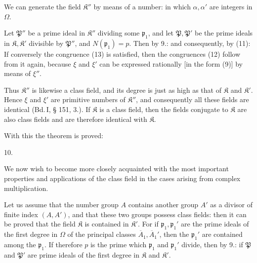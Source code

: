We can generate the field $\mathfrak{K}''$ by means of a number:
in which $\alpha, \alpha'$ are integers in $\Omega$.

Let $\mathfrak{P}''$ be a prime ideal in $\mathfrak{K}''$ dividing some $\mathfrak{p}_1$, and let
$\mathfrak{P}, \mathfrak{P}'$ be the prime ideals in $\mathfrak{K}, \mathfrak{K}'$ divisible by $\mathfrak{P}''$, and $N(\mathfrak{p}_1) = p$.
Then by 9.:
and consequently, by (11):
If conversely the congruence (13) is satisfied, then the congruences (12)
follow from it again, because $\xi$ and $\xi'$ can be expressed rationally
[in the form (9)] by means of $\xi''$.

Thus $\mathfrak{K}''$ is likewise a class field, and its degree is just as
high as that of $\mathfrak{K}$ and $\mathfrak{K}'$. Hence $\xi$ and $\xi'$ are primitive
numbers of $\mathfrak{K}''$, and consequently all these fields are identical (Bd.\,I,
§ 151, 3.). If $\mathfrak{K}$ is a class field, then the fields conjugate to $\mathfrak{K}$
are also class fields and are therefore identical with $\mathfrak{K}$.

With this the theorem is proved:

10. 

We now wish to become more closely acquainted with the most important properties and
applications of the class field in the cases arising from complex
multiplication.

Let us assume that the number group $A$ contains another group $A'$ as a divisor of
finite index $(A, A')$, and that these two groups
possess class fields:
then it can be proved that the field $\mathfrak{K}$ is contained in $\mathfrak{K}'$. For if
$\mathfrak{p}_1, \mathfrak{p}_1'$ are the prime ideals of the first degree in $\Omega$ of the
principal classes $\overline{A}_1, \overline{A}_1'$, then the $\mathfrak{p}_1'$ are contained
among the $\mathfrak{p}_1$. If therefore $p$ is the prime which $\mathfrak{p}_1$ and $\mathfrak{p}_1'$ divide,
then by 9.:
if $\mathfrak{P}$ and $\mathfrak{P}'$ are prime ideals of the first degree in $\mathfrak{K}$ and $\mathfrak{K}'$.
